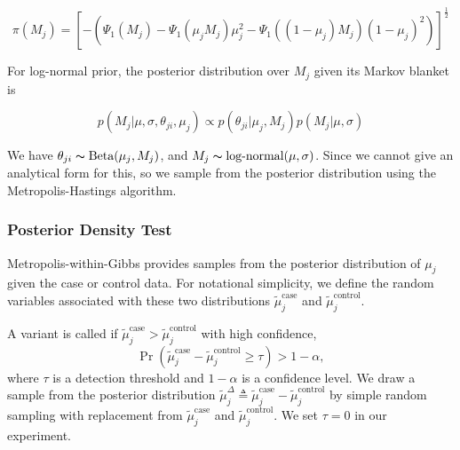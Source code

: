 \documentclass[11pt,reqno]{amsart}
\begin{document}
\begin{equation}
\pi\left({M}_{j}\right) = [-\left(\Psi_{1}(M_{j}) - \Psi_{1}(\mu_{j} M_{j})\mu_{j}^{2} - \Psi_{1}((1-\mu_{j})M_{j}){(1-\mu_{j})^{2}}\right)]^{\frac{1}{2}}
\end{equation}

For log-normal prior, the posterior distribution over $M_{j}$ given its Markov blanket is

\begin{equation}
	p( M_{j} |\mu, \sigma, \theta_{ji},\mu_j) \propto p(\theta_{ji} | \mu_j, M_j) p(M_{j} | \mu, \sigma)
\end{equation}

We have $ \theta_{ji}\thicksim\text{Beta}(\mu_{j},M_{j})$, and $ M_{j} \thicksim \text{log-normal}(\mu, \sigma)$. Since we cannot give an analytical form for this, so we sample from the posterior distribution using the Metropolis-Hastings algorithm.


\subsubsection{Posterior Density Test}\label{sec:hypothesis_test}
Metropolis-within-Gibbs provides samples from the posterior distribution of $\mu_j$ given the case or control data. For notational simplicity, we define the random variables associated with these two distributions $\tilde{\mu}_j^{\text{case}}$ and $\tilde{\mu}_j^{\text{control}}$.

A variant is called if $\tilde{\mu}_j^{\text{case}} > \tilde{\mu}_j^{\text{control}}$ with high confidence,
\begin{equation}\label{eqn:bayes_test}
	\Pr( \tilde{\mu}_j^{\text{case}} - \tilde{\mu}_j^{\text{control}} \geq \tau ) > 1-\alpha,
\end{equation}
where $\tau$ is a detection threshold and $1-\alpha$ is a confidence level. We draw a sample from the posterior distribution $\tilde{\mu}_j^{\Delta} \triangleq \tilde{\mu}_j^{\text{case}} - \tilde{\mu}_j^{\text{control}}$ by simple random sampling with replacement from $\tilde{\mu}_j^{\text{case}}$ and $\tilde{\mu}_j^{\text{control}}$. We set $\tau = 0$ in our experiment.



\end{document}
